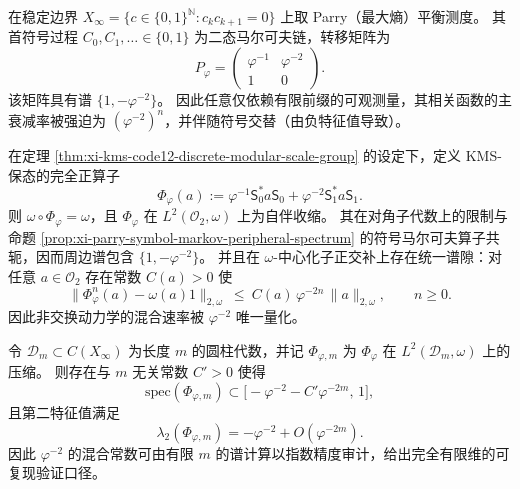 \begin{proposition}\label{prop:xi-parry-symbol-markov-peripheral-spectrum}
在稳定边界 \(X_\infty=\{c\in\{0,1\}^{\mathbb N}:c_kc_{k+1}=0\}\) 上取 Parry（最大熵）平衡测度。
其首符号过程 \(C_0,C_1,\dots\in\{0,1\}\) 为二态马尔可夫链，转移矩阵为
\[
P_\varphi=
\begin{pmatrix}
\varphi^{-1} & \varphi^{-2}\\[2pt]
1 & 0
\end{pmatrix}.
\]
该矩阵具有谱 \(\{1,-\varphi^{-2}\}\)。
因此任意仅依赖有限前缀的可观测量，其相关函数的主衰减率被强迫为 \((\varphi^{-2})^{n}\)，并伴随符号交替（由负特征值导致）。
\end{proposition}

\begin{theorem}\label{thm:xi-kms-transfer-operator-spectral-gap-explicit}
在定理 \ref{thm:xi-kms-code12-discrete-modular-scale-group} 的设定下，定义 KMS-保态的完全正算子
\[
\Phi_{\varphi}(a):=\varphi^{-1}\mathsf{S}_0^\ast a\mathsf{S}_0+\varphi^{-2}\mathsf{S}_1^\ast a\mathsf{S}_1.
\]
则 \(\omega\circ\Phi_{\varphi}=\omega\)，且 \(\Phi_{\varphi}\) 在 \(L^2(\mathcal{O}_2,\omega)\) 上为自伴收缩。
其在对角子代数上的限制与命题 \ref{prop:xi-parry-symbol-markov-peripheral-spectrum} 的符号马尔可夫算子共轭，因而周边谱包含 \(\{1,-\varphi^{-2}\}\)。
并且在 \(\omega\)-中心化子正交补上存在统一谱隙：对任意 \(a\in\mathcal{O}_2\) 存在常数 \(C(a)>0\) 使
\[
\|\Phi_{\varphi}^n(a)-\omega(a)1\|_{2,\omega}\ \le\ C(a)\,\varphi^{-2n}\,\|a\|_{2,\omega},
\qquad n\ge 0.
\]
因此非交换动力学的混合速率被 \(\varphi^{-2}\) 唯一量化。
\end{theorem}

\begin{proposition}\label{prop:xi-finite-truncation-spectrum-converges}
令 \(\mathcal D_m\subset C(X_\infty)\) 为长度 \(m\) 的圆柱代数，并记 \(\Phi_{\varphi,m}\) 为 \(\Phi_\varphi\) 在 \(L^2(\mathcal D_m,\omega)\) 上的压缩。
则存在与 \(m\) 无关常数 \(C'>0\) 使得
\[
\mathrm{spec}(\Phi_{\varphi,m})\subset\bigl[-\varphi^{-2}-C'\varphi^{-2m},\,1\bigr],
\]
且第二特征值满足
\[
\lambda_2(\Phi_{\varphi,m})=-\varphi^{-2}+O(\varphi^{-2m}).
\]
因此 \(\varphi^{-2}\) 的混合常数可由有限 \(m\) 的谱计算以指数精度审计，给出完全有限维的可复现验证口径。
\end{proposition}

